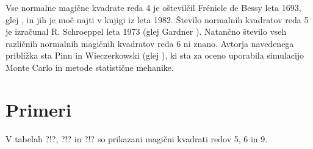\documentclass[a4paper,12pt]{article}
\begin{document}
Vse normalne magične kvadrate reda 4 je oštevilčil Frénicle de Bessy
leta 1693, glej \cite{bassy}, in jih je moč najti v knjigi \cite{berlekamp}
iz leta 1982. Število normalnih kvadratov reda 5 je izračunal
R. Schroeppel leta 1973 (glej Gardner \cite{Gardner}).
Natančno število vseh različnih normalnih magičnih kvadratov reda 6 ni znano.
Avtorja navedenega približka sta Pinn in Wieczerkowski (glej \cite{pinn}), ki
sta za oceno uporabila simulacijo Monte Carlo in metode statistične mehanike.


\section{Primeri}

V tabelah ?!?, ?!? in ?!? so prikazani
magični kvadrati redov 5, 6 in 9.





\newpage



\end{document}
